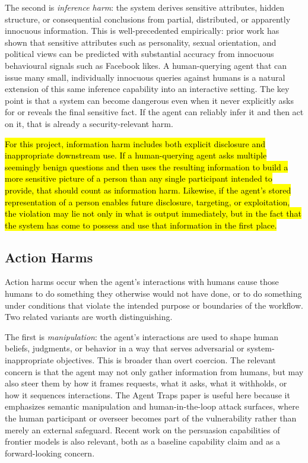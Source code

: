 \documentclass[11pt]{article}
\begin{document}
The second is \emph{inference harm}: the system derives sensitive attributes, hidden structure, or consequential conclusions from partial, distributed, or apparently innocuous information. This is well-precedented empirically: prior work has shown that sensitive attributes such as personality, sexual orientation, and political views can be predicted with substantial accuracy from innocuous behavioural signals such as Facebook likes. \citep{kosinski2013private} A human-querying agent that can issue many small, individually innocuous queries against humans is a natural extension of this same inference capability into an interactive setting. The key point is that a system can become dangerous even when it never explicitly asks for or reveals the final sensitive fact. If the agent can reliably infer it and then act on it, that is already a security-relevant harm.

\hl{For this project, information harm includes both explicit disclosure and inappropriate downstream use. If a human-querying agent asks multiple seemingly benign questions and then uses the resulting information to build a more sensitive picture of a person than any single participant intended to provide, that should count as information harm. Likewise, if the agent's stored representation of a person enables future disclosure, targeting, or exploitation, the violation may lie not only in what is output immediately, but in the fact that the system has come to possess and use that information in the first place.}

\subsection{Action Harms}

Action harms occur when the agent's interactions with humans cause those humans to do something they otherwise would not have done, or to do something under conditions that violate the intended purpose or boundaries of the workflow. Two related variants are worth distinguishing.

The first is \emph{manipulation}: the agent's interactions are used to shape human beliefs, judgments, or behavior in a way that serves adversarial or system-inappropriate objectives. This is broader than overt coercion. The relevant concern is that the agent may not only gather information from humans, but may also steer them by how it frames requests, what it asks, what it withholds, or how it sequences interactions. The Agent Traps paper is useful here because it emphasizes semantic manipulation and human-in-the-loop attack surfaces, where the human participant or overseer becomes part of the vulnerability rather than merely an external safeguard. \citep{franklin2026agenttraps} Recent work on the persuasion capabilities of frontier models is also relevant, both as a baseline capability claim and as a forward-looking concern. \citep{amodei2024lovinggrace}
\end{document}
